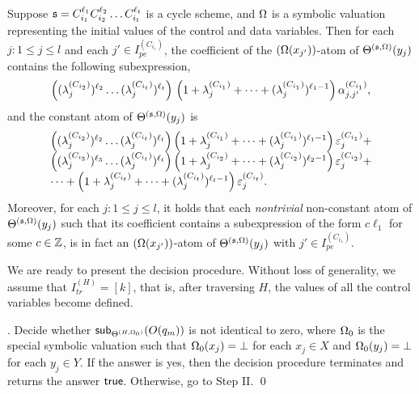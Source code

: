 \begin{proposition}\label{prop-cycle-schm}
Suppose $\schm=C_{i_1}^{\ell_1} C_{i_2}^{\ell_2} \dots C_{i_t}^{\ell_t}$ is a cycle scheme, and $\initval$ is a symbolic valuation representing the initial values of the control and data variables. Then for each $j: 1 \le j \le l$ and each $j' \in I^{(C_{i_1})}_{pe}$, the coefficient of the $(\initval(x_{j'}))$-atom of $\sumf^{(\schm,\initval)}(y_j)$ contains the following subexpression,
\[\left((\lambda^{(C_{i_2})}_{j})^{\ell_2} \dots (\lambda^{(C_{i_t})}_{j})^{\ell_t}\right) \\
\left(1+\lambda^{(C_{i_1})}_{j} + \dots + (\lambda^{(C_{i_1})}_{j})^{\ell_1-1} \right) \csta^{(C_{i_1})}_{j,j'},\]
and the constant atom of $\sumf^{(\schm,\initval)}(y_j)$ is
\[
\begin{array}{l c l}
\left((\lambda^{(C_{i_2})}_{j})^{\ell_2} \dots (\lambda^{(C_{i_t})}_{j})^{\ell_t}\right)
\left(1+\lambda^{(C_{i_1})}_{j} + \dots + (\lambda^{(C_{i_1})}_{j})^{\ell_1-1} \right) \cste^{(C_{i_1})}_{j} + \\
\left((\lambda^{(C_{i_3})}_{j})^{\ell_3} \dots (\lambda^{(C_{i_t})}_{j})^{\ell_t}\right)
\left(1+\lambda^{(C_{i_2})}_{j} + \dots + (\lambda^{(C_{i_2})}_{j})^{\ell_2-1} \right) \cste^{(C_{i_2})}_{j} +\\
 \dots + 
\left(1+\lambda^{(C_{i_t})}_{j} + \dots + (\lambda^{(C_{i_t})}_{j})^{\ell_t-1} \right) \cste^{(C_{i_t})}_{j}.
\end{array}
\]
Moreover, for each $j: 1 \le j \le l$, it holds that each \emph{nontrivial} non-constant atom of $\sumf^{(\schm,\initval)}(y_j)$ such that its coefficient contains a subexpression  of the form $c\ell_1$ for some $c \in \intnum$, is in fact an $(\initval(x_{j'}))$-atom of $\sumf^{(\schm,\initval)}(y_j)$ with $j' \in I^{(C_{i_1})}_{pe}$.
\end{proposition}

We are ready to present the decision procedure. Without loss of generality, we assume that $I^{(H)}_{tr}=[k]$, that is, after traversing $H$, the values of all the control variables become defined.

\smallskip

. Decide whether $\sub{O(q_m)}{\sumf^{(H,\initval_0)}}$ is not identical to zero, where $\initval_0$ is the special symbolic valuation such that $\initval_0(x_j)=\bot$ for each $x_j \in X$ and $\initval_0(y_j)=\bot$ for each $y_j \in Y$. If the answer is yes, then the decision procedure terminates and returns the answer $\ltrue$. Otherwise, go to Step II. \qed

